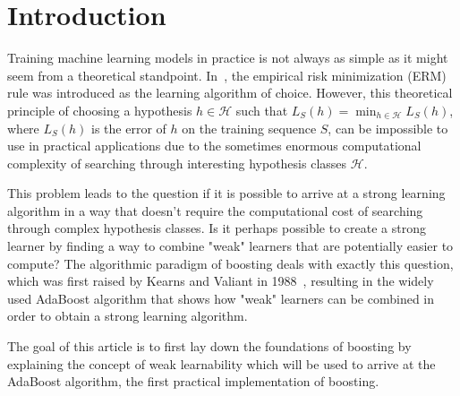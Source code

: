 \section{Introduction}

Training machine learning models in practice is not always as simple as it might seem from a theoretical standpoint.
In~\cite[chapter 2]{SSBD14}, the empirical risk minimization (ERM) rule was introduced as the learning algorithm
of choice.
However, this theoretical principle of choosing a hypothesis \mbox{$h \in \mathcal{H}$} such that
$L_S(h) = \min_{h \in \mathcal{H}} L_S(h)$, where $L_S(h)$ is the error of $h$ on the training sequence $S$,
can be impossible to use in practical applications due to the sometimes enormous computational complexity of searching
through interesting hypothesis classes $\mathcal{H}$.

This problem leads to the question if it is possible to arrive at a strong learning algorithm in a way that doesn't require the
computational cost of searching through complex hypothesis classes.
Is it perhaps possible to create a strong learner by finding a way to combine "weak" learners that are potentially easier to compute?
The algorithmic paradigm of boosting deals with exactly this question, 
which was first raised by Kearns and Valiant in 1988~\cite{kv-lbffahf-88}, 
resulting in the widely used AdaBoost algorithm that
shows how "weak" learners can be combined in order to obtain a strong learning algorithm.

The goal of this article is to first lay down the foundations of boosting by explaining the concept of weak 
learnability which
will be used to arrive at the AdaBoost algorithm, the first practical implementation of boosting.
